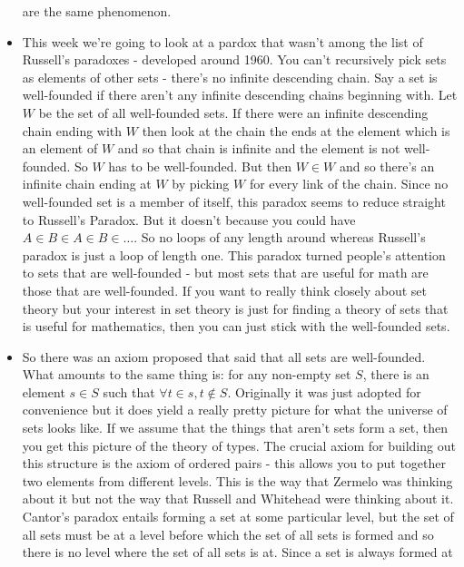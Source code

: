 \documentclass[12pt]{article}
\theoremstyle{definition}
\begin{document}
\begin{itemize}
        are the same phenomenon. 
    \item
        This week we're going to look at a pardox that wasn't among the list of
        Russell's paradoxes - developed around 1960. You can't recursively pick
        sets as elements of other sets - there's no infinite descending chain.
        Say a set is well-founded if there aren't any infinite descending
        chains beginning with. Let $W$ be the set of all well-founded sets. If
        there were an infinite descending chain ending with $W$ then look at
        the chain the ends at the element which is an element of $W$ and so
        that chain is infinite and the element is not well-founded. So $W$ has
        to be well-founded. But then $W \in W$ and so there's an infinite chain
        ending at $W$ by picking $W$ for every link of the chain. Since no
        well-founded set is a member of itself, this paradox seems to reduce
        straight to Russell's Paradox. But it doesn't because you could have $A
        \in B \in A \in B \in \dots$. So no loops of any length around whereas
        Russell's paradox is just a loop of length one. This paradox turned
        people's attention to sets that are well-founded - but most sets that
        are useful for math are those that are well-founded. If you want to
        really think closely about set theory but your interest in set theory
        is just for finding a theory of sets that is useful for mathematics,
        then you can just stick with the well-founded sets.
    \item
        So there was an axiom proposed that said that all sets are
        well-founded. What amounts to the same thing is: for any non-empty set
        $S$, there is an element $s \in S$ such that $\forall t \in s, t \notin
        S$. Originally it was just adopted for convenience but it does yield a
        really pretty picture for what the universe of sets looks like. If we
        assume that the things that aren't sets form a set, then you get this
        picture of the theory of types. The crucial axiom for building out this
        structure is the axiom of ordered pairs - this allows you to put
        together two elements from different levels. This is the way that
        Zermelo was thinking about it but not the way that Russell and
        Whitehead were thinking about it. Cantor's paradox entails forming a
        set at some particular level, but the set of all sets must be at a
        level before which the set of all sets is formed and so there is no
        level where the set of all sets is at. Since a set is always formed at

\end{itemize}
\end{document}
